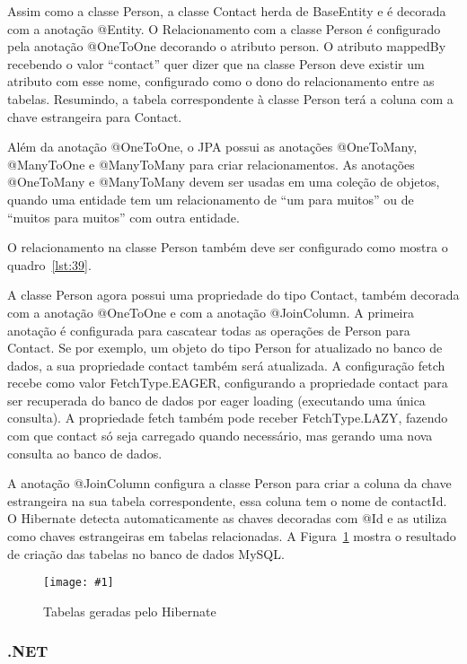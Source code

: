 \documentclass[a4paper,12pt]{article}
\newcommand{\figura}[3] {
	\begin{figure}[ht]
		\centering
		\texttt{[image: \#1]}
		\caption{#2}
		\label{#3}
	\end{figure}
	\FloatBarrier
}
\newcommand{\javacode}[3] {
	
}
\begin{document}
Assim como a classe Person, a classe Contact herda de BaseEntity e é decorada com a anotação @Entity. O Relacionamento com a classe Person é configurado pela anotação @OneToOne decorando o atributo person. O atributo mappedBy recebendo o valor “contact” quer dizer que na classe Person deve existir um atributo com esse nome, configurado como o dono do relacionamento entre as tabelas. Resumindo, a tabela correspondente à classe Person terá a coluna com a chave estrangeira para Contact.

Além da anotação @OneToOne, o JPA possui as anotações @OneToMany, @ManyToOne e @ManyToMany para criar relacionamentos. As anotações @OneToMany e @ManyToMany devem ser usadas em uma coleção de objetos, quando uma entidade tem um relacionamento de “um para muitos” ou de “muitos para muitos” com outra entidade.

O relacionamento na classe Person também deve ser configurado como mostra o quadro~\ref{lst:39}.

\javacode{code/39.txt}{Classe Person com relacionamento para Contact}{lst:39}

A classe Person agora possui uma propriedade do tipo Contact, também decorada com a anotação @OneToOne e com a anotação @JoinColumn. A primeira anotação é configurada para cascatear todas as operações de Person para Contact. Se por exemplo, um objeto do tipo Person for atualizado no banco de dados, a sua propriedade contact também será atualizada. A configuração fetch recebe como valor FetchType.EAGER, configurando a propriedade contact para ser recuperada do banco de dados por eager loading (executando uma única consulta). A propriedade fetch também pode receber FetchType.LAZY, fazendo com que contact só seja carregado quando necessário, mas gerando uma nova consulta ao banco de dados.

A anotação @JoinColumn configura a classe Person para criar a coluna da chave estrangeira na sua tabela correspondente, essa coluna tem o nome de contactId. O Hibernate detecta automaticamente as chaves decoradas com @Id e as utiliza como chaves estrangeiras em tabelas relacionadas. A Figura~\ref{fig:36} mostra o resultado de criação das tabelas no banco de dados MySQL. 

\figura{36.png}{Tabelas geradas pelo Hibernate}{fig:36}

\subsubsection{.NET}
\end{document}
